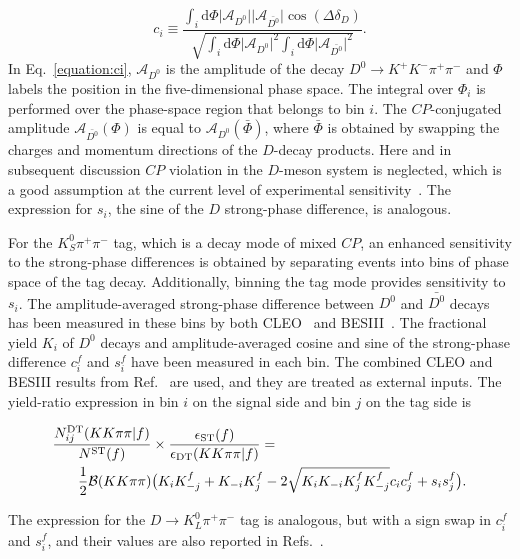 \documentclass[12pt, a4paper, notitlepage, onecolumn]{article}
\newcommand*{\diff}{\mathrm{d}}
\begin{document}
\begin{equation}
    c_i\equiv\frac{\int_i\diff\Phi\lvert\mathcal{A}_{D^0}\rvert\lvert\mathcal{A}_{\bar{D^0}}\rvert\cos(\Delta\delta_D)}{\sqrt{\int_i\diff\Phi\lvert\mathcal{A}_{D^0}\rvert^2\int_i\diff\Phi\lvert\mathcal{A}_{\bar{D^0}}\rvert^2}}.
    \label{equation:ci}
\end{equation}
In Eq.~\eqref{equation:ci}, $\mathcal{A}_{D^0}$ is the amplitude of the decay $D^0\to K^+K^-\pi^+\pi^-$ and $\Phi$ labels the position in the five-dimensional phase space. The integral over $\Phi_i$ is performed over the phase-space region that belongs to bin $i$. The $C\!P$-conjugated amplitude $\mathcal{A}_{\bar{D^0}}(\Phi)$ is equal to $\mathcal{A}_{D^0}(\bar{\Phi})$, where $\bar{\Phi}$ is obtained by swapping the charges and momentum directions of the $D$-decay products. Here and in subsequent discussion $C\!P$ violation in the $D$-meson system is neglected, which is a good assumption at the current level of experimental sensitivity~\cite{HFLAV18}. The expression for $s_i$, the sine of the $D$ strong-phase difference, is analogous.

For the $K_S^0\pi^+\pi^-$ tag, which is a decay mode of mixed $C\!P$, an enhanced sensitivity to the strong-phase differences is obtained by separating events into bins of phase space of the tag decay. Additionally, binning the tag mode provides sensitivity to $s_i$. The amplitude-averaged strong-phase difference between $D^0$ and $\bar{D^0}$ decays has been measured in these bins by both CLEO~\cite{cite:CLEOcisiKSpipi} and BESIII~\cite{cite:KSpipiStrongPhase}. The fractional yield $K_i$ of $D^0$ decays and amplitude-averaged cosine and sine of the strong-phase difference $c_i^f$ and $s_i^f$ have been measured in each bin. The combined CLEO and BESIII results from Ref.~\cite{cite:KSpipiStrongPhase} are used, and they are treated as external inputs. The yield-ratio expression in bin $i$ on the signal side and bin $j$ on the tag side is

\begin{linenomath}
    \begin{align}
        \frac{N_{ij}^{\rm DT}(KK\pi\pi | f)}{N^{\rm ST}(f)}&\times\frac{\epsilon_{\rm ST}(f)}{\epsilon_{\rm DT}(KK\pi\pi | f)} = \nonumber \\
        \frac{1}{2}\mathcal{B}(KK\pi\pi)&\big(K_iK_{-j}^f + K_{-i}K_j^f - 2\sqrt{K_iK_{-i}K_j^fK_{-j}^f}c_ic_j^f + s_is_j^f\big).
        \label{equation:DT_ST_yield_ratio_K0pipi}
    \end{align}
\end{linenomath}
The expression for the $D\to K_L^0\pi^+\pi^-$ tag is analogous, but with a sign swap in $c_i^f$ and $s_i^f$, and their values are also reported in Refs.~\cite{cite:CLEOcisiKSpipi,cite:KSpipiStrongPhase}.
\end{document}
